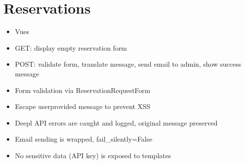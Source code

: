 \documentclass[letterpaper,10pt,english]{sphinxmanual}
\begin{document}
\section{Reservations}
\label{\detokenize{index:reservations}}\begin{itemize}
\item {} 
\sphinxAtStartPar
Vues

\end{itemize}
\label{\detokenize{index:module-reservations.views}}

\begin{fulllineitems}
\label{\detokenize{index:reservations.views.reservation_request_view}}
\pysigstartsignatures
\pysiglinewithargsret
{}
{}
{}
\pysigstopsignatures\begin{description}
\begin{itemize}
\item {} 
\sphinxAtStartPar
GET: display empty reservation form

\item {} 
\sphinxAtStartPar
POST: validate form, translate message, send email to admin, show success message

\end{itemize}

\begin{itemize}
\item {} 
\sphinxAtStartPar
Form validation via ReservationRequestForm

\item {} 
\sphinxAtStartPar
Escape user\sphinxhyphen{}provided message to prevent XSS

\item {} 
\sphinxAtStartPar
Deepl API errors are caught and logged, original message preserved

\item {} 
\sphinxAtStartPar
Email sending is wrapped, fail\_silently=False

\item {} 
\sphinxAtStartPar
No sensitive data (API key) is exposed to templates

\end{itemize}

\end{description}

\end{fulllineitems}
\end{document}
